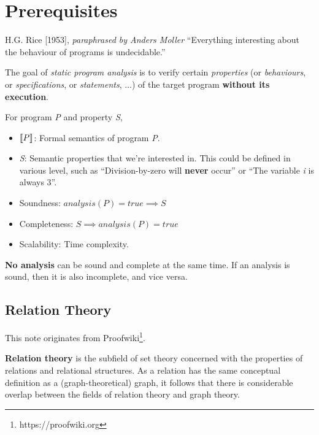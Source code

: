 \chapter{Prerequisites}
\begin{chapquote}{H.G. Rice [1953], \textit{paraphrased by Anders Moller}}
  ``Everything interesting about the behaviour of programs is
  undecidable.''
\end{chapquote}

The goal of \textit{static program analysis} is to verify certain
\textsl{properties} (or \textsl{behaviours}, or
\textsl{specifications}, or \textsl{statements}, ...) of the target
program \textbf{without its execution}.

For program \textsl{P} and property \textsl{S},

\begin{itemize}
\item $ \llbracket P \rrbracket $: Formal semantics of program \textsl{P}.

\item \textsl{S}: Semantic properties that we're interested in. This
  could be defined in various level, such as ``Division-by-zero will
  \textbf{never} occur'' or ``The variable \textit{i} is always 3''.

\item Soundness: $ analysis(P) = true \implies S $

\item Completeness: $ S \implies analysis(P) = true $

\item Scalability: Time complexity.
\end{itemize}


\textbf{No analysis} can be sound and complete at the same time. If an
analysis is sound, then it is also incomplete, and vice versa.

\section{Relation Theory}
This note originates from
Proofwiki\footnote{https://proofwiki.org}.


\textbf{Relation theory} is the subfield of set theory concerned with
the properties of relations and relational structures. As a relation
has the same conceptual definition as a (graph-theoretical) graph, it
follows that there is considerable overlap between the fields of
relation theory and graph theory.


